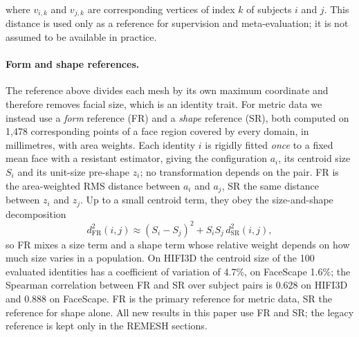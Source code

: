 \documentclass[10pt,twocolumn,letterpaper]{article}
\begin{document}
where $v_{i,k}$ and $v_{j,k}$ are corresponding vertices of index $k$ of subjects $i$ and $j$. This distance is used only as a reference for supervision and meta-evaluation; it is not assumed to be available in practice.


\paragraph{Form and shape references.}
\label{sec:form_shape_reference}
The reference above divides each mesh by its own maximum coordinate and therefore removes facial size, which is an identity trait. For metric data we instead use a \emph{form} reference (FR) and a \emph{shape} reference (SR), both computed on 1{,}478 corresponding points of a face region covered by every domain, in millimetres, with area weights.
Each identity $i$ is rigidly fitted \emph{once} to a fixed mean face with a resistant estimator, giving the configuration $a_i$, its centroid size $S_i$ and its unit-size pre-shape $z_i$; no transformation depends on the pair. FR is the area-weighted RMS distance between $a_i$ and $a_j$, SR the same distance between $z_i$ and $z_j$. Up to a small centroid term, they obey the size-and-shape decomposition
\begin{equation}
d_{\mathrm{FR}}^2(i,j)\approx(S_i-S_j)^2+S_iS_j\,d_{\mathrm{SR}}^2(i,j),
\label{eq:size_shape_main}
\end{equation}
so FR mixes a size term and a shape term whose relative weight depends on how much size varies in a population. On HIFI3D the centroid size of the 100 evaluated identities has a coefficient of variation of 4.7\%, on FaceScape 1.6\%; the Spearman correlation between FR and SR over subject pairs is 0.628 on HIFI3D and 0.888 on FaceScape.
FR is the primary reference for metric data, SR the reference for shape alone. All new results in this paper use FR and SR; the legacy reference is kept only in the REMESH sections.
\end{document}
